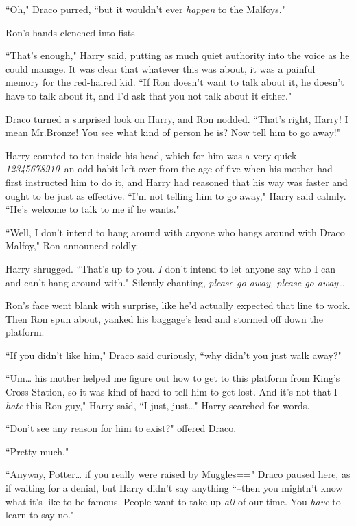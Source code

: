 ``Oh," Draco purred, ``but it wouldn't ever \emph{happen} to the Malfoys."

Ron's hands clenched into fists\---

``That's enough," Harry said, putting as much quiet authority into the voice as he could manage. It was clear that whatever this was about, it was a painful memory for the red-haired kid. ``If Ron doesn't want to talk about it, he doesn't have to talk about it, and I'd ask that you not talk about it either."

Draco turned a surprised look on Harry, and Ron nodded. ``That's right, Harry! I mean Mr.\?Bronze! You see what kind of person he is? Now tell him to go away!"

Harry counted to ten inside his head, which for him was a very quick \emph{12345678910}\---an odd habit left over from the age of five when his mother had first instructed him to do it, and Harry had reasoned that his way was faster and ought to be just as effective. ``I'm not telling him to go away," Harry said calmly. ``He's welcome to talk to me if he wants."

``Well, I don't intend to hang around with anyone who hangs around with Draco Malfoy," Ron announced coldly.

Harry shrugged. ``That's up to you. \emph{I} don't intend to let anyone say who I can and can't hang around with." Silently chanting, \emph{please go away, please go away{\ldots}}

Ron's face went blank with surprise, like he'd actually expected that line to work. Then Ron spun about, yanked his baggage's lead and stormed off down the platform.

``If you didn't like him," Draco said curiously, ``why didn't you just walk away?"

``Um{\ldots} his mother helped me figure out how to get to this platform from King's Cross Station, so it was kind of hard to tell him to get lost. And it's not that I \emph{hate} this Ron guy," Harry said, ``I just, just{\ldots}" Harry searched for words.

``Don't see any reason for him to exist?" offered Draco.

``Pretty much."

``Anyway, Potter{\ldots} if you really were raised by Muggles\===" Draco paused here, as if waiting for a denial, but Harry didn't say anything ``\---then you mightn't know what it's like to be famous. People want to take up \emph{all} of our time. You \emph{have} to learn to say no."

